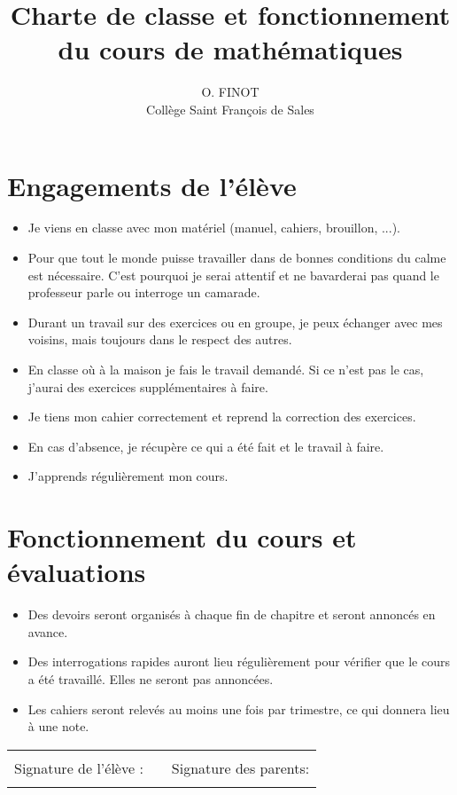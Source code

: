 \documentclass[a4paper, 11pt]{article}
\author{O. FINOT \\ Collège Saint François de Sales}
\title{Charte de classe et fonctionnement du cours de mathématiques}
\date{}
\begin{document}
\maketitle	


	
\section{Engagements de l'élève}

\begin{itemize}
	
	\item Je viens en classe avec mon matériel (manuel, cahiers, brouillon, ...).
	
	\item Pour que tout le monde puisse travailler dans de bonnes conditions du calme est nécessaire. C'est pourquoi je serai attentif et ne bavarderai pas quand le professeur parle ou interroge un camarade.
	
	\item Durant un travail sur des exercices ou en groupe, je peux échanger avec mes voisins, mais toujours dans le respect des autres.
	
	\item En classe où à la maison je fais le travail demandé. Si ce n'est pas le cas, j'aurai des exercices supplémentaires à faire.
	
	\item Je tiens mon cahier correctement et reprend la correction des exercices.
	
	\item En cas d'absence, je récupère ce qui a été fait et le travail à faire.
	
	\item J'apprends régulièrement mon cours. 
\end{itemize}
	

\section{Fonctionnement du cours et évaluations}

\begin{itemize}
	\item Des devoirs seront organisés à chaque fin de chapitre et seront annoncés en avance.
	
	\item Des interrogations rapides auront lieu régulièrement pour vérifier que le cours a été travaillé. Elles ne seront pas annoncées.
	
	\item Les cahiers seront relevés au moins une fois par trimestre, ce qui donnera lieu à une note.
	
\end{itemize}


\begin{tabular}{ccr}
	\hline
	\\
	Signature de l'élève : & \hspace*{5cm} & Signature des parents: \\
	&  &                      
\end{tabular}
	
\end{document}
